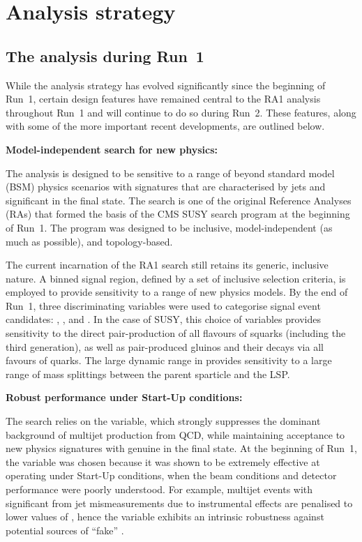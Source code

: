 \section{Analysis strategy}
\label{sec:strategy}

\subsection{The analysis during Run~1}

While the analysis strategy has evolved significantly since the
beginning of Run~1, certain design features have remained central to
the RA1 analysis throughout Run~1 and will continue to do so during
Run~2. These features, along with some of the more important recent
developments, are outlined below.

{\bf Model-independent search for new physics:}

The analysis is designed to be sensitive to a range of beyond standard
model (BSM) physics scenarios with signatures that are characterised
by jets and significant \met in the final state. The search is one of
the original Reference Analyses (RAs) that formed the basis of the CMS
SUSY search program at the beginning of Run~1. The program was
designed to be inclusive, model-independent (as much as possible), and
topology-based. 

The current incarnation of the RA1 search still retains its generic,
inclusive nature. A binned signal region, defined by a set of
inclusive selection criteria, is employed to provide sensitivity to a
range of new physics models. By the end of Run~1, three discriminating
variables were used to categorise signal event candidates: \scalht,
\njet, and \nb. In the case of SUSY, this choice of variables provides
sensitivity to the direct pair-production of all flavours of squarks
(including the third generation), as well as pair-produced gluinos and
their decays via all favours of quarks. The large dynamic range in
\scalht provides sensitivity to a large range of mass splittings
between the parent sparticle and the LSP.

{\bf Robust performance under Start-Up conditions:}

The search relies on the \alphat variable, which strongly suppresses
the dominant background of multijet production from QCD, while
maintaining acceptance to new physics signatures with genuine \met in
the final state. At the beginning of Run~1, the \alphat variable was
chosen because it was shown to be extremely effective at operating
under Start-Up conditions, when the beam conditions and detector
performance were poorly understood. For example, multijet
events with significant \met from jet mismeasurements due to
instrumental effects are penalised to lower values of \alphat, hence
the variable exhibits an intrinsic robustness against potential
sources of ``fake'' \met.

